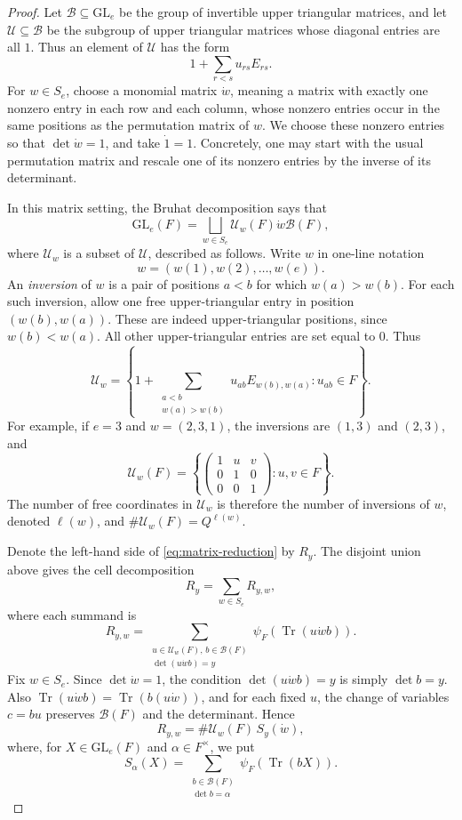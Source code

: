 \documentclass[11pt]{amsart}
\renewcommand{\subset}{\subseteq}
\numberwithin{equation}{section}
\theoremstyle{remark}
\theoremstyle{plain}
\theoremstyle{definition}
\begin{document}
\begin{proof}
Let \(\mathcal{B}\subset\mathrm{GL}_e\) be the group of invertible upper
triangular matrices, and let \(\mathcal{U}\subset \mathcal{B}\) be the subgroup of upper
triangular matrices whose diagonal entries are all \(1\).  Thus an
element of \(\mathcal{U}\) has the form
\[
1+\sum_{r<s}u_{rs}E_{rs}.
\]
For \(w\in S_e\), choose a monomial matrix \(\dot w\), meaning a
matrix with exactly one nonzero entry in each row and each column,
whose nonzero entries occur in the same positions as the permutation
matrix of \(w\).  We choose these nonzero entries so that
\(\det\dot w=1\), and take \(\dot 1=1\).  Concretely, one may start
with the usual permutation matrix and rescale one of its nonzero
entries by the inverse of its determinant.

In this matrix setting, the Bruhat decomposition says that
\[
\mathrm{GL}_e(F)=\bigsqcup_{w\in S_e} \mathcal{U}_w(F)\dot w\mathcal{B}(F),
\]
where \(\mathcal{U}_w\) is a subset of \(\mathcal{U}\), described as follows.  Write \(w\)
in one-line notation
\[
w=(w(1),w(2),\ldots,w(e)).
\]
An \emph{inversion} of \(w\) is a pair of positions \(a<b\) for which
\(w(a)>w(b)\).  For each such inversion, allow one free
upper-triangular entry in position \((w(b),w(a))\).  These are indeed
upper-triangular positions, since \(w(b)<w(a)\).  All other
upper-triangular entries are set equal to \(0\).  Thus
\[
\mathcal{U}_w=
\left\{
1+\sum_{\substack{a<b\\w(a)>w(b)}} u_{ab}E_{w(b),w(a)}
: u_{ab}\in F
\right\}.
\]
For example, if \(e=3\) and \(w=(2,3,1)\), the inversions are
\((1,3)\) and \((2,3)\), and
\[
\mathcal{U}_w(F)=
\left\{
\begin{pmatrix}
  1&u&v\\0&1&0\\0&0&1
\end{pmatrix}
: u,v\in F
\right\}.
\]
The number of free coordinates in \(\mathcal{U}_w\) is therefore the number of
inversions of \(w\), denoted \(\ell(w)\), and
\(\#\mathcal{U}_w(F)=Q^{\ell(w)}\).

Denote the left-hand side of \eqref{eq:matrix-reduction} by \(R_y\).
The disjoint union above gives the cell decomposition
\[
R_y=\sum_{w\in S_e} R_{y,w},
\]
where each summand is
\[
R_{y,w}
=
\sum_{\substack{u\in \mathcal{U}_w(F),\, b\in \mathcal{B}(F)\\
    \det(u\dot wb)=y}}
\psi_F(\operatorname{Tr}(u\dot wb)).
\]
Fix \(w\in S_e\).  Since \(\det\dot w=1\), the condition \(\det(u\dot wb)=y\) is simply
\(\det b=y\).  Also
\(\operatorname{Tr}(u\dot wb)=\operatorname{Tr}(b(u\dot w))\), and for
each fixed \(u\), the change of variables \(c=bu\) preserves \(\mathcal{B}(F)\)
and the determinant.  Hence
\[
R_{y,w}=\#\mathcal{U}_w(F)\,S_y(\dot w),
\]
where, for \(X\in\mathrm{GL}_e(F)\) and \(\alpha\in F^\times\), we put
\[
S_\alpha(X)=
\sum_{\substack{b\in \mathcal{B}(F)\\ \det b=\alpha}}
\psi_F(\operatorname{Tr}(bX)).
\]


\end{proof}
\end{document}
